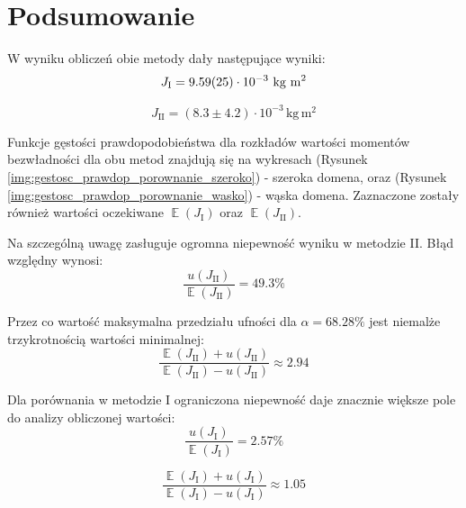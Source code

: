 \documentclass[twocolumn, a4paper, polish, 10pt]{article}
\DeclareMathOperator{\EX}{\mathbb{E}}
\begin{document}
\section{Podsumowanie}
W wyniku obliczeń obie metody dały następujące wyniki:
\begin{displaymath}
    J_{\mathrm{I}} = 9.59(25) \cdot 10^{-3}~\mathrm{kg~m^2} \\
\end{displaymath}

\begin{displaymath}
    J_{\mathrm{II}} = (8.3 \pm 4.2) \cdot 10^{-3} \, \mathrm{kg \, m^2}
\end{displaymath}

Funkcje gęstości prawdopodobieństwa dla rozkładów wartości momentów bezwładności dla obu metod znajdują się na wykresach (Rysunek \ref{img:gestosc_prawdop_porownanie_szeroko}) - szeroka domena, oraz (Rysunek \ref{img:gestosc_prawdop_porownanie_wasko}) - wąska domena. Zaznaczone zostały również wartości oczekiwane $\EX(J_{\mathrm{I}})$ oraz $\EX(J_{\mathrm{II}})$.





Na szczególną uwagę zasługuje ogromna niepewność wyniku w metodzie II. Błąd względny wynosi:
\begin{displaymath}
    \frac{ u(J_{\mathrm{II}}) }{ \EX(J_{\mathrm{II}}) } = 49.3\%
\end{displaymath}

Przez co wartość maksymalna przedziału ufności dla $\alpha = 68.28\%$ jest niemalże trzykrotnością wartości minimalnej:
\begin{displaymath}
    \frac{ \EX(J_{\mathrm{II}}) + u(J_{\mathrm{II}}) }{ \EX(J_{\mathrm{II}}) - u(J_{\mathrm{II}}) }
    \approx 2.94
\end{displaymath}

Dla porównania w metodzie I ograniczona niepewność daje znacznie większe pole do analizy obliczonej wartości:
\begin{displaymath}
    \frac{ u(J_{\mathrm{I}}) }{ \EX(J_{\mathrm{I}}) } = 2.57\%
\end{displaymath}

\begin{displaymath}
    \frac{ \EX(J_{\mathrm{I}}) + u(J_{\mathrm{I}}) }{ \EX(J_{\mathrm{I}}) - u(J_{\mathrm{I}}) }
    \approx 1.05
\end{displaymath}
\end{document}
